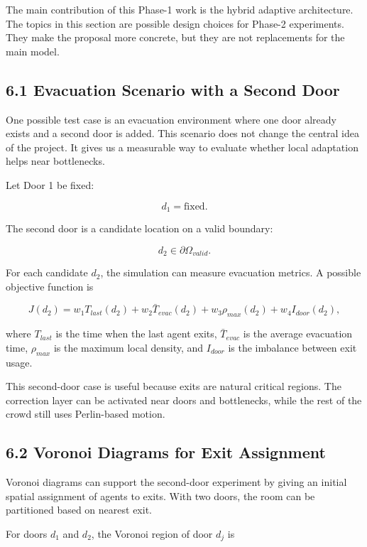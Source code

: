 \documentclass[
  11pt,
]{article}
\begin{document}
The main contribution of this Phase-1 work is the hybrid adaptive
architecture. The topics in this section are possible design choices for
Phase-2 experiments. They make the proposal more concrete, but they are
not replacements for the main model.

\subsection{6.1 Evacuation Scenario with a Second
Door}\label{evacuation-scenario-with-a-second-door}

One possible test case is an evacuation environment where one door
already exists and a second door is added. This scenario does not change
the central idea of the project. It gives us a measurable way to
evaluate whether local adaptation helps near bottlenecks.

Let Door 1 be fixed:

\[
d_1 = \text{fixed}.
\]

The second door is a candidate location on a valid boundary:

\[
d_2 \in \partial \Omega_{valid}.
\]

For each candidate \(d_2\), the simulation can measure evacuation
metrics. A possible objective function is

\[
J(d_2)
=
w_1 T_{last}(d_2)
+
w_2 \bar{T}_{evac}(d_2)
+
w_3 \rho_{max}(d_2)
+
w_4 I_{door}(d_2),
\]

where \(T_{last}\) is the time when the last agent exits,
\(\bar{T}_{evac}\) is the average evacuation time, \(\rho_{max}\) is the
maximum local density, and \(I_{door}\) is the imbalance between exit
usage.

This second-door case is useful because exits are natural critical
regions. The correction layer can be activated near doors and
bottlenecks, while the rest of the crowd still uses Perlin-based motion.

\subsection{6.2 Voronoi Diagrams for Exit
Assignment}\label{voronoi-diagrams-for-exit-assignment}

Voronoi diagrams can support the second-door experiment by giving an
initial spatial assignment of agents to exits. With two doors, the room
can be partitioned based on nearest exit.

For doors \(d_1\) and \(d_2\), the Voronoi region of door \(d_j\) is
\end{document}
